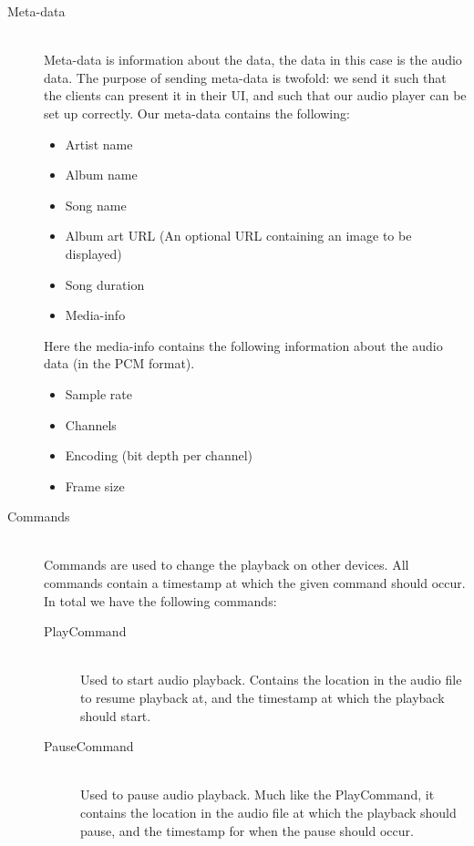 \begin{description}
    \item[Meta-data] \hfill \\
        Meta-data is information about the data, the data in this case is the audio data.
        The purpose of sending meta-data is twofold: we send it such that the clients can present it in their UI, and such that our audio player can be set up correctly.
        Our meta-data contains the following:
        \begin{itemize}
            \item Artist name
            \item Album name
            \item Song name
            \item Album art URL (An optional URL containing an image to be displayed)
            \item Song duration
            \item Media-info
        \end{itemize}
        Here the media-info contains the following information about the audio data (in the \ac{PCM} format).
        \begin{itemize}
            \item Sample rate
            \item Channels
            \item Encoding (bit depth per channel)
            \item Frame size
        \end{itemize}
    \item[Commands] \hfill \\
        Commands are used to change the playback on other devices.
        All commands contain a timestamp at which the given command should occur.
        In total we have the following commands:
        \begin{description}
            \item[PlayCommand] \hfill\\
                Used to start audio playback.
                Contains the location in the audio file to resume playback at, and the timestamp at which the playback should start.
            \item[PauseCommand] \hfill\\
                Used to pause audio playback.
                Much like the PlayCommand, it contains the location in the audio file at which the playback should pause, and the timestamp for when the pause should occur.

\end{description}
\end{description}
